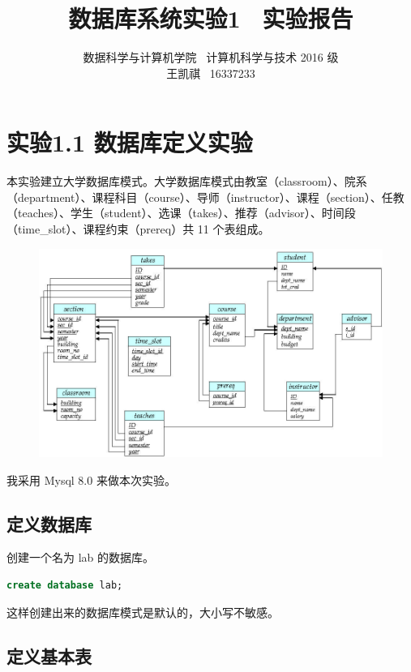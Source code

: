 \documentclass{article}
\begin{document}
\title{数据库系统实验1 \ 实验报告}
\author {数据科学与计算机学院 \ 计算机科学与技术 2016 级 \\ 王凯祺 \ 16337233}
\maketitle

\section{实验1.1 数据库定义实验}

本实验建立大学数据库模式。大学数据库模式由教室（classroom）、院系（department）、课程科目（course）、导师（instructor）、课程（section）、任教（teaches）、学生（student）、选课（takes）、推荐（advisor）、时间段（time\_slot）、课程约束（prereq）共 11 个表组成。

\begin{figure}[!hbp]
\centering
\includegraphics[scale=1.0]{a.jpg}
\end{figure}

我采用 Mysql 8.0 来做本次实验。

\subsection{定义数据库}

创建一个名为 lab 的数据库。

\begin{lstlisting}[language=sql]
create database lab;
\end{lstlisting}

这样创建出来的数据库模式是默认的，大小写不敏感。

\subsection{定义基本表}
\end{document}

